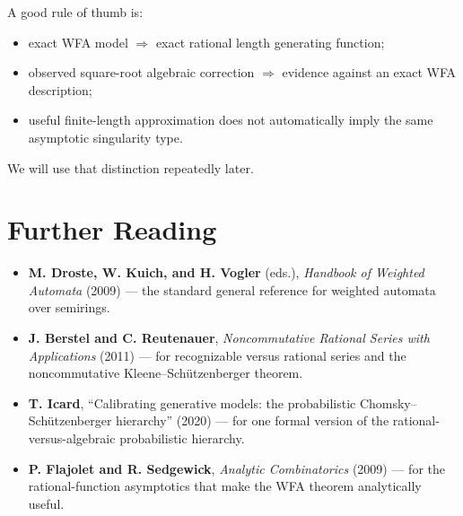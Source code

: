 A good rule of thumb is:
\begin{itemize}
  \item exact WFA model $\Rightarrow$ exact rational length generating function;
  \item observed square-root algebraic correction $\Rightarrow$ evidence against an exact WFA description;
  \item useful finite-length approximation does not automatically imply the same asymptotic singularity type.
\end{itemize}
We will use that distinction repeatedly later.

\section*{Further Reading}

\begin{itemize}
  \item \textbf{M. Droste, W. Kuich, and H. Vogler} (eds.), \emph{Handbook of Weighted Automata} (2009) \cite{DrosteKuichVogler2009} --- the standard general reference for weighted automata over semirings.
  \item \textbf{J. Berstel and C. Reutenauer}, \emph{Noncommutative Rational Series with Applications} (2011) \cite{BerstelReutenauer2011} --- for recognizable versus rational series and the noncommutative Kleene--Sch\"utzenberger theorem.
  \item \textbf{T. Icard}, ``Calibrating generative models: the probabilistic Chomsky--Sch\"utzenberger hierarchy'' (2020) \cite{Icard2020} --- for one formal version of the rational-versus-algebraic probabilistic hierarchy.
  \item \textbf{P. Flajolet and R. Sedgewick}, \emph{Analytic Combinatorics} (2009) \cite{FlajoletSedgewick2009} --- for the rational-function asymptotics that make the WFA theorem analytically useful.
\end{itemize}

